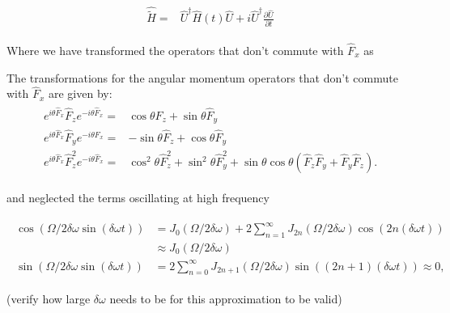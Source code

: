 \begin{align}
	\begin{split}
		\hat{\tilde{H}} = & \hat{U}^{\dagger}\hat{H}(t)\hat{U} + i\hat{U}^{\dagger} \frac{\partial\hat{U}}{\partial t} 	
	\end{split}
\end{align}


Where we have transformed the operators that don't commute with $\hat{F}_x$ as

The transformations for the angular momentum operators that don't commute with $\hat{F}_x$ are given by: 
%
\begin{align}
	\begin{split}
		e^{i\theta \hat{F}_x} \hat{F}_z e^{-i\theta \hat{F}_x}=& \cos\theta \hat{F}_z + \sin\theta\hat{F}_y \\
		e^{i\theta \hat{F}_x} \hat{F}_y e^{-i\theta \hat{F}_x} =& -\sin\theta\hat{F}_z +\cos\theta\hat{F}_y \\
		e^{i\theta \hat{F}_x} \hat{F}_z^2 e^{-i\theta \hat{F}_x} = &\cos^2\theta\hat{F}_z^2+\sin^2\theta\hat{F}_y^2 + \sin\theta\cos\theta(\hat{F}_z\hat{F}_y + \hat{F}_y\hat{F}_z).
	\end{split}
\end{align}

and neglected the terms oscillating at high frequency

\begin{align}
	\begin{split}
	\cos(\Omega/2\delta\omega\sin(\delta\omega t))&= J_0(\Omega/2\delta\omega) + 2\sum_{n=1}^{\infty}J_{2n}(\Omega/2\delta\omega)\cos(2n(\delta\omega t)) \\
	& \approx J_0(\Omega/2\delta\omega) \\
	\sin(\Omega/2\delta\omega\sin(\delta\omega t))&= 2\sum_{n=0}^{\infty}J_{2n+1}(\Omega/2\delta\omega)\sin((2n+1)(\delta\omega t)) \approx 0,
	\end{split}
\end{align} 


(verify how large $\delta\omega$ needs to be for this approximation to be valid)
%
%
 

